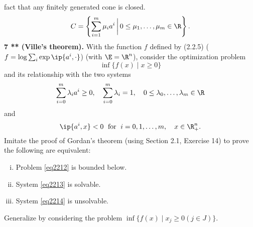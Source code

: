 \documentclass[../borwein-lewis_notes.tex]{subfiles}
\begin{document}
fact that any finitely generated cone is closed. 
\begin{equation*}
C = \left\{\sum_{i=1}^m \mu_i a^i \,\bigg|\, 0\leq \mu_1,\ldots,\mu_m
\in \R\right\}.
\end{equation*}
\noindent \textbf{7 ** (Ville's theorem).} With the function $f$ defined 
by (2.2.5) ($f=\log\sum_i\exp\ip{a^i,\cdot}$)
 (with $\E=\R^n$), consider the optimization problem 
\begin{equation}
\label{eq2212}
\inf\{f(x)\mid x\geq 0\}
\end{equation}
and its relationship with the two systems 
\begin{equation}
\label{eq2213}
\sum_{i=0}^m \lambda_i a^i \geq 0, \quad \sum_{i=0}^m \lambda_i = 1, 
\quad 0\leq \lambda_0,\ldots,\lambda_m\in\R
\end{equation}
and 
\begin{equation}
\ip{a^i,x}<0 \;\text{ for } \; i=0,1,\ldots, m,\quad x\in\R_+^n.
\label{eq2214}
\end{equation}
Imitate the proof of Gordan's theorem (using Section 2.1, Exercise 14) 
to prove the following are equivalent: 
\begin{enumerate}[(i)]
\item Problem \eqref{eq2212} is bounded below.
\item System \eqref{eq2213} is solvable. 
\item System \eqref{eq2214} is unsolvable.
\end{enumerate}
Generalize by considering the problem $\inf\{f(x)\mid x_j\geq 0 (j\in J)\}$.
\end{document}
